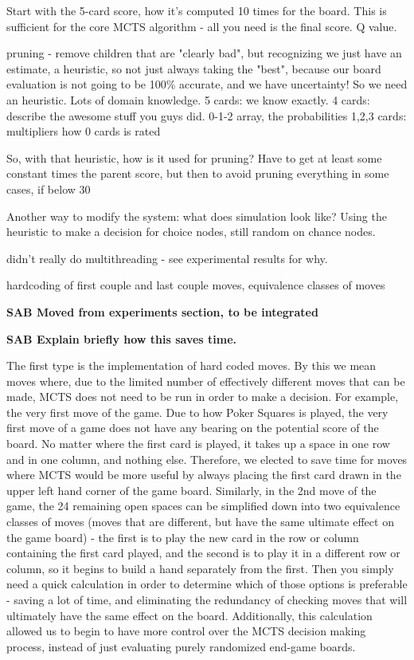 \documentclass[letterpaper]{article}
\begin{document}
Start with the 5-card score, how it's computed 10 times for the board. This is sufficient for the core MCTS algorithm - all you need is the final score. Q value.

pruning - remove children that are "clearly bad", but recognizing we just have an estimate, a heuristic, so not just always taking the "best", because our board evaluation is not going to be 100\% accurate, and we have uncertainty! So we need an heuristic. Lots of domain knowledge.
5 cards: we know exactly.
4 cards: describe the awesome stuff you guys did. 0-1-2 array, the probabilities
1,2,3 cards: multipliers
how 0 cards is rated

So, with that heuristic, how is it used for pruning? Have to get at least some constant times the parent score, but then to avoid pruning everything in some cases, if below 30%

Another way to modify the system: what does simulation look like? Using the heuristic to make a decision for choice nodes, still random on chance nodes.

didn't really do multithreading - see experimental results for why.

hardcoding of first couple and last couple moves, equivalence classes of moves

{\bf SAB Moved from experiments section, to be integrated}

{\bf SAB Explain briefly how this saves time.}

The first type is the implementation of hard coded moves. By this we mean moves where, due to the limited number of effectively different moves that can be made, MCTS does not need to be run in order to make a decision. For example, the very first move of the game. Due to how Poker Squares is played, the very first move of a game does not have any bearing on the potential score of the board. No matter where the first card is played, it takes up a space in one row and in one column, and nothing else. Therefore, we elected to save time for moves where MCTS would be more useful by always placing the first card drawn in the upper left hand corner of the game board.
Similarly, in the 2nd move of the game, the 24 remaining open spaces can be simplified down into two equivalence classes of moves (moves that are different, but have the same ultimate effect on the game board) - the first is to play the new card in the row or column containing the first card played, and the second is to play it in a different row or column, so it begins to build a hand separately from the first. Then you simply need a quick calculation in order to determine which of those options is preferable - saving a lot of time, and eliminating the redundancy of checking moves that will ultimately have the same effect on the board. Additionally, this calculation allowed us to begin to have more control over the MCTS decision making process, instead of just evaluating purely randomized end-game boards.
\end{document}
